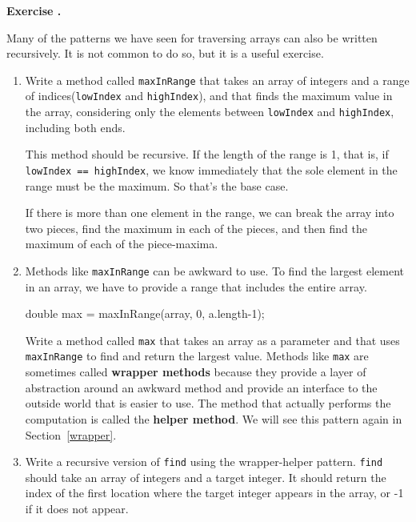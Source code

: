 \documentclass{book}
\newcounter{exercisenum}
\renewcommand{\theexercisenum}{{\thechapter}.\arabic{exercisenum}}
\newenvironment{exercisesize}{\begin{small}}{\end{small}}
\newcommand{\exerciseheader}[2]{                                          
     
  \begin{exercisesize}                                                    
     
     
  \def\theenumi{\alph{enumi}}                                             
  \def\labelenumi{\theenumi.}                                             
  \def\theenumii{\roman{enumii}}                                          
  \def\labelenumii{\theenumii.}                                           
  {\bf Exercise {#1}{#2}}\hspace{0.1in}                 
}
\newcommand{\startexercise}[1]{%
  \refstepcounter{exercisenum}                                            
  \exerciseheader{\theexercisenum}{#1}                                    
}
\newcommand{\stopexercise}{%
  {\hfill}                                                               
  \end{exercisesize}      
}
\newcommand{\normaldif}{}
\newenvironment{exercise}{\startexercise{\normaldif{}}}{\stopexercise}
\begin{document}
\begin{exercise}
Many of the patterns we have seen for traversing arrays can
also be written recursively.  It is not common to do so, but
it is a useful exercise.

\begin{enumerate}

\item Write a method called {\tt maxInRange} that takes an array of
integers and a range of indices({\tt lowIndex} and {\tt highIndex}),
and that finds the maximum value in the array, considering only the
elements between {\tt lowIndex} and {\tt highIndex}, including both
ends.

This method should be recursive.  If the length of the range is 1,
that is, if {\tt lowIndex == highIndex}, we know immediately that the
sole element in the range must be the maximum.  So that's the base
case.

If there is more than one element in the range, we can break the array
into two pieces, find the maximum in each of the pieces, and then find
the maximum of each of the piece-maxima.

\item Methods like {\tt maxInRange} can be awkward to use.  To
find the largest element in an array, we have to provide a range
that includes the entire array.

\begin{verbatimtab}
    double max = maxInRange(array, 0, a.length-1);
\end{verbatimtab}

Write a method called {\tt max} that takes an array as a parameter
and that uses {\tt maxInRange} to find and return the largest value.
Methods like {\tt max} are sometimes called {\bf wrapper methods}
because they provide a layer of abstraction around an awkward method
and provide an interface to
the outside world that is easier to use.  The method that actually
performs the computation is called the {\bf helper method}.  We will
see this pattern again in Section~\ref{wrapper}.

\item Write a recursive version of {\tt find} using the
wrapper-helper pattern.  {\tt find} should take an array of
integers and a target integer.  It should return the index
of the first location where the target integer appears in the
array, or -1 if it does not appear.

\end{enumerate}
\end{exercise}
\end{document}
